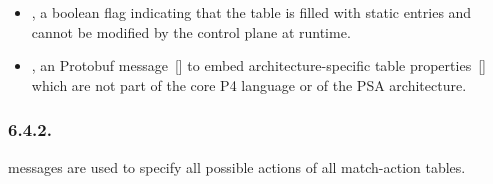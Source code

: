 \documentclass[11pt]{article}
\begin{document}
{\begin{itemize}
\begin{itemize}[noitemsep,topsep=\mdcompacttopsep]%

\item{} (default value), which means that idle timeout is not
supported for this table.%

\item{}, which means that the control plane should be notified of
the expiration of a table entry by means of a notification (see section on
).%
\end{itemize}%

\item{}
, a boolean flag indicating that the table is filled with
static entries and cannot be modified by the control plane at runtime.%

\item{}
, an  Protobuf message~[] to embed
architecture-specific table properties~[] which are not part
of the core P4 language or of the PSA architecture.%
\end{itemize}%

\subsubsection{6.4.2.\hspace*{0.5em}}\label{sec-action}%

\noindent{} messages are used to specify all possible actions of all match-action
tables.%

}
\end{document}

